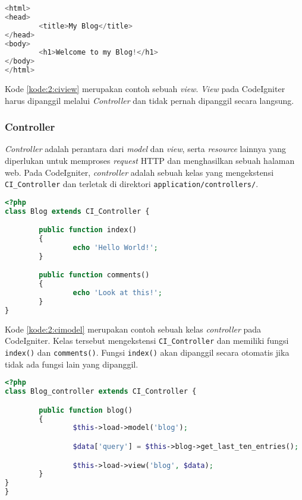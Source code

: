 \begin{lstlisting}[language=php, caption=Contoh \textit{view}, label=kode:2:ciview]
<html>
<head>
        <title>My Blog</title>
</head>
<body>
        <h1>Welcome to my Blog!</h1>
</body>
</html>
\end{lstlisting}

Kode \ref{kode:2:ciview} merupakan contoh sebuah \textit{view}. \textit{View} pada CodeIgniter harus dipanggil melalui \textit{Controller} dan tidak pernah dipanggil secara langsung.
	
\subsubsection{Controller}
\textit{Controller} adalah perantara dari \textit{model} dan \textit{view}, serta \textit{resource} lainnya yang diperlukan untuk memproses \textit{request} HTTP dan menghasilkan sebuah halaman web. Pada CodeIgniter, \textit{controller} adalah sebuah kelas yang mengekstensi \verb|CI_Controller| dan terletak di direktori \verb|application/controllers/|.

\begin{lstlisting}[language=php, caption=Contoh \textit{controller}, label=kode:2:cicontroller]
<?php
class Blog extends CI_Controller {

        public function index()
        {
                echo 'Hello World!';
        }

        public function comments()
        {
                echo 'Look at this!';
        }
}
\end{lstlisting}

Kode \ref{kode:2:cimodel} merupakan contoh sebuah kelas \textit{controller} pada CodeIgniter. Kelas tersebut mengekstensi \verb|CI_Controller| dan memiliki fungsi \verb|index()| dan \verb|comments()|. Fungsi \verb|index()| akan dipanggil secara otomatis jika tidak ada fungsi lain yang dipanggil. 

\begin{lstlisting}[language=php, caption=Contoh memuat \textit{model} dan menampilkan \textit{view}, label=kode:2:cimodelview]
<?php
class Blog_controller extends CI_Controller {

        public function blog()
        {
                $this->load->model('blog');

                $data['query'] = $this->blog->get_last_ten_entries();

                $this->load->view('blog', $data);
        }
}
}
\end{lstlisting}


